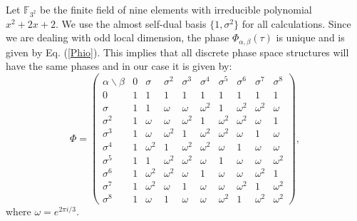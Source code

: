 \documentclass[a4paper]{article}
\begin{document}
  Let $\mathbb F_{3^2}$ be the finite field of nine elements
  with irreducible polynomial $x^2 + 2x + 2$. We use the
  almost self-dual basis $\{1, \sigma^2\}$ for all
  calculations. Since we are dealing with odd local
  dimension, the phase $\Phi_{\alpha,\beta}(\tau)$ is unique
  and is given by Eq. (\ref{Phio}). This implies that all
  discrete phase space structures will have the same phases
  and in our case it is given by:
  \begin{equation}
    \Phi =
    \displaystyle \left(\begin{array}{rrrrrrrrrr}
    \alpha \backslash \beta & 0 & \sigma & \sigma^2 &
    \sigma^3 & \sigma^4 & \sigma^5 & \sigma^6 & \sigma^7 & \sigma^8 \\
    0 & 1 & 1 & 1 & 1 & 1 & 1 & 1 & 1 & 1 \\
    \sigma & 1 & 1 & \omega & \omega & \omega^{2} & 1 & \omega^{2} & \omega^{2} & \omega \\
    \sigma^2 & 1 & \omega & \omega & \omega^{2} & 1 & \omega^{2} & \omega^{2} & \omega & 1 \\
    \sigma^3 & 1 & \omega & \omega^{2} & 1 & \omega^{2} & \omega^{2} & \omega & 1 & \omega \\
    \sigma^4 & 1 & \omega^{2} & 1 & \omega^{2} & \omega^{2} & \omega & 1 & \omega & \omega \\
    \sigma^5 & 1 & 1 & \omega^{2} & \omega^{2} & \omega & 1 & \omega & \omega & \omega^{2} \\
    \sigma^6 & 1 & \omega^{2} & \omega^{2} & \omega & 1 & \omega & \omega & \omega^{2} & 1 \\
    \sigma^7 & 1 & \omega^{2} & \omega & 1 & \omega & \omega & \omega^{2} & 1 & \omega^{2} \\
    \sigma^8 & 1 & \omega & 1 & \omega & \omega & \omega^{2} & 1 & \omega^{2} & \omega^{2}
    \end{array}\right),
  \end{equation}
  where $\omega = e^{2\pi i / 3}$. 

\end{document}

